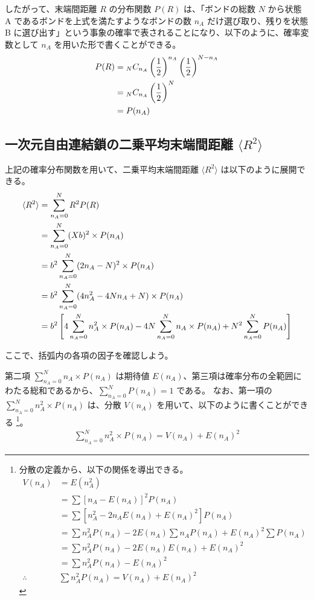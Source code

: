 \documentclass[a4paper,11pt]{ltjsarticle}
\begin{document}
\begin{appendix}
したがって、末端間距離 $R$ の分布関数 $P(R)$ は、「ボンドの総数 $N$ から状態 A であるボンドを上式を満たすようなボンドの数 $n_A$ だけ選び取り、残りを状態 B に選び出す」という事象の確率で表されることになり、以下のように、確率変数として $n_A$ を用いた形で書くことができる。
\begin{align*}
P(R)
	&= {}_N C_{n_A} \left(\dfrac{1}{2} \right)^{n_A} \left(\dfrac{1}{2} \right)^{N-n_A} \notag \\
	&= {}_N C_{n_A} \left(\dfrac{1}{2} \right)^N \\
	&= P(n_A)
\end{align*}

\subsection{一次元自由連結鎖の二乗平均末端間距離 $\langle R^2 \rangle$}
\label{ssec:1DRW_R2}

上記の確率分布関数を用いて、二乗平均末端間距離 $\langle R^2 \rangle$ は以下のように展開できる。
\begin{align*}
\langle R^2 \rangle 
	&= \sum_{n_A = 0}^{N} R^2 P(R) \notag \\
	&= \sum_{n_A = 0}^{N} (Xb)^2 \times P(n_A) \notag \\
	&= b^2 \sum_{n_A = 0}^{N} (2n_A - N)^2 \times P(n_A) \notag \\
	&= b^2 \sum_{n_A = 0}^{N} (4n_A^2 -4Nn_A + N) \times P(n_A) \notag \\
	&= b^2 \left[ 4 \sum_{n_A = 0}^{N} n_A^2 \times P(n_A) - 4N\sum_{n_A = 0}^{N} n_A \times P(n_A) + N^2 \sum_{n_A = 0}^{N} P(n_A) \right]
\end{align*}

ここで、括弧内の各項の因子を確認しよう。

第二項 $\displaystyle \sum_{n_A = 0}^{N} n_A \times P(n_A)$ は期待値 $E(n_A)$、第三項は確率分布の全範囲にわたる総和であるから、$\displaystyle \sum_{n_A = 0}^{N} P(n_A) =1$ である。
なお、第一項の $\displaystyle \sum_{n_A = 0}^{N} n_A^2 \times P(n_A)$ は、分散 $V(n_A)$ を用いて、以下のように書くことができる
\footnote
{
分散の定義から、以下の関係を導出できる。
\begin{align*}
V(n_A)
	&=E(n_A^2) \\
	&=\sum [n_A - E(n_A)]^2 P(n_A)\\
	&=\sum [n_A^2 -2 n_A E(n_A) + E(n_A)^2] P(n_A)\\
	&=\sum n_A^2 P(n_A) -2 E(n_A) \sum n_A P(n_A) + E(n_A)^2 \sum P(n_A) \\
	&=\sum n_A^2 P(n_A) -2 E(n_A) E(n_A) + E(n_A)^2 \\
	&=\sum n_A^2 P(n_A) - E(n_A)^2 \\
\therefore \quad &\sum n_A^2 P(n_A) = V(n_A) + E(n_A)^2
\end{align*}
}。
\begin{align*}
\displaystyle \sum_{n_A = 0}^{N} n_A^2 \times P(n_A)
	= V(n_A)+E(n_A)^2
\end{align*}



\end{appendix}
\end{document}

